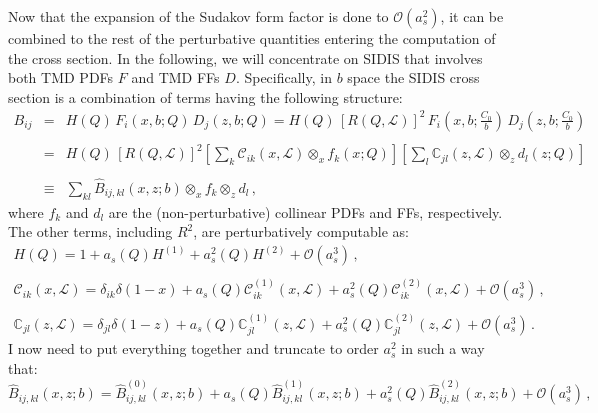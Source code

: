 \documentclass[10pt,a4paper]{article}
\begin{document}
Now that the expansion of the Sudakov form factor is done to
$\mathcal{O}(a_s^2)$, it can be combined to the rest of the
perturbative quantities entering the computation of the cross
section. In the following, we will concentrate on SIDIS that involves
both TMD PDFs $F$ and TMD FFs $D$. Specifically, in $b$ space the
SIDIS cross section is a combination of terms having the following
structure:
\begin{equation}
\begin{array}{rcl}
  \displaystyle B_{ij} &=& \displaystyle
                           H(Q)\,F_i(x,b;Q)\,D_j(z,b;Q)
                           =H(Q)\,\left[R(Q,\mathcal{L})\right]^2
                           \,F_i\left(x,b;\frac{C_0}{b}\right)\,D_j\left(z,b;\frac{C_0}{b}\right)\\
\\
&=& \displaystyle H(Q)\,\left[R(Q,\mathcal{L})\right]^2
                           \left[\sum_{k}
    \mathcal{C}_{ik}(x,\mathcal{L}) \mathop{\otimes}_x
    f_k\left(x;Q\right)\right]\left[\sum_{l}
    \mathbb{C}_{jl}(z,\mathcal{L}) \mathop{\otimes}_z
    d_l\left(z;Q\right)\right]\\
\\
&\equiv& \displaystyle \sum_{kl}\hat{B}_{ij,kl}(x,z;b)\mathop{\otimes}_{x}f_k \mathop{\otimes}_{z}d_l \,,
\end{array}
\end{equation}
where $f_k$ and $d_l$ are the (non-perturbative) collinear PDFs and FFs,
respectively. The other terms, including $R^2$, are perturbatively
computable as:
\begin{equation}
\begin{array}{l}
\displaystyle H(Q) = 1+a_s(Q)H^{(1)}+a_s^2(Q)H^{(2)}+\mathcal{O}(a_s^3)\,,\\
\\
\displaystyle \mathcal{C}_{ik}(x,\mathcal{L}) = \delta_{ik}\delta(1-x)+a_s(Q)
  \mathcal{C}_{ik}^{(1)}(x,\mathcal{L}) +a_s^2(Q) \mathcal{C}_{ik}^{(2)}(x,\mathcal{L})
  +\mathcal{O}(a_s^3) \,,\\
\\
\displaystyle \mathbb{C}_{jl}(z,\mathcal{L}) = \delta_{jl}\delta(1-z)+a_s(Q) \mathbb{C}_{jl}^{(1)}(z,\mathcal{L}) +a_s^2(Q) \mathbb{C}_{jl}^{(2)}(z,\mathcal{L}) +\mathcal{O}(a_s^3) \,.
\end{array}
\end{equation}
I now need to put everything together and truncate to order $a_s^2$ in
such a way that:
\begin{equation}
\hat{B}_{ij,kl}(x,z;b) = \hat{B}_{ij,kl}^{(0)}(x,z;b)+a_s(Q) \hat{B}_{ij,kl}^{(1)}(x,z;b)+a_s^2(Q) \hat{B}_{ij,kl}^{(2)}(x,z;b)+\mathcal{O}(a_s^3) \,,
\end{equation}
\end{document}
